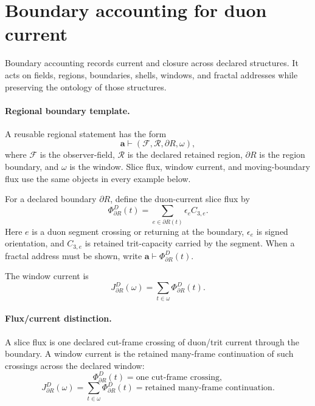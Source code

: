 \section{Boundary accounting for duon current}\label{sec:boundary-accounting}

Boundary accounting records current and closure across declared structures. It acts on fields, regions, boundaries, shells, windows, and fractal addresses while preserving the ontology of those structures.

\paragraph{Regional boundary template.}
A reusable regional statement has the form
\[
\mathbf a\vdash(\mathcal F,\mathcal R,\partial R,\omega),
\]
where \(\mathcal F\) is the observer-field, \(\mathcal R\) is the declared retained region, \(\partial R\) is the region boundary, and \(\omega\) is the window. Slice flux, window current, and moving-boundary flux use the same objects in every example below.

\begin{definition}
For a declared boundary \(\partial R\), define the duon-current slice flux by
\begin{equation}
\Phi^D_{\partial R}(t)
=
\sum_{e\in\partial R(t)}
\epsilon_e C_{3,e}.
\label{eq:slice-flux}
\end{equation}
Here \(e\) is a duon segment crossing or returning at the boundary, \(\epsilon_e\) is signed orientation, and \(C_{3,e}\) is retained trit-capacity carried by the segment. When a fractal address must be shown, write \(\mathbf a\vdash \Phi^D_{\partial R}(t)\).
\end{definition}

\begin{definition}
The window current is
\begin{equation}
J^D_{\partial R}(\omega)
=
\sum_{t\in\omega}
\Phi^D_{\partial R}(t).
\label{eq:window-current}
\end{equation}
\end{definition}

\paragraph{Flux/current distinction.}
A slice flux is one declared cut-frame crossing of duon/trit current through the boundary. A window current is the retained many-frame continuation of such crossings across the declared window:
\[
\Phi^D_{\partial R}(t)=\text{one cut-frame crossing},
\]
\[
J^D_{\partial R}(\omega)
=
\sum_{t\in\omega}\Phi^D_{\partial R}(t)
=\text{retained many-frame continuation}.
\]

